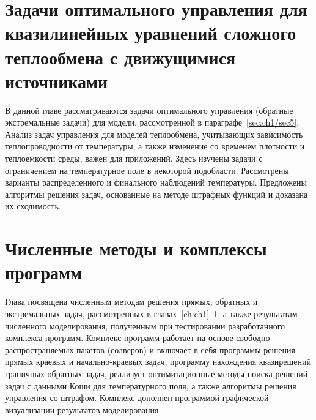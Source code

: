 \documentclass[a4paper,14pt,oneside,openany]{memoir}
\begin{document}
    \chapter{Задачи оптимального управления для квазилинейных уравнений сложного теплообмена с движущимися источниками}
    \label{ch:ch3}
    В данной главе рассматриваются задачи оптимального управления (обратные
    экстремальные задачи) для модели, рассмотренной в параграфе~\ref{sec:ch1/sec5}.
    Анализ задач управления для моделей теплообмена, учитывающих зависимость
    теплопроводности от температуры, а также изменение со временем
    плотности и теплоемкости среды, важен для приложений.
    Здесь изучены задачи с ограничением на температурное поле в некоторой подобласти.
    Рассмотрены варианты распределенного и финального наблюдений температуры.
    Предложены алгоритмы решения задач, основанные на методе
    штрафных функций и доказана их сходимость.
%    
    
    


    \chapter{Численные методы и комплексы программ}\label{ch:ch4}
    Глава посвящена численным методам решения прямых, обратных и экстремальных задач,
    рассмотренных в главах~\ref{ch:ch1}--\ref{ch:ch3}, а также результатам численного моделирования,
    полученным при тестировании разработанного комплекса программ.
    Комплекс программ работает на основе свободно
    распространяемых пакетов (солверов) и включает в себя программы
    решения прямых краевых и начально-краевых задач, программу нахождения
    квазирешений граничных обратных задач, реализует оптимизационные
    методы поиска решений задач с данными Коши для температурного поля, а %
    также алгоритмы решения управления со штрафом.
    Комплекс дополнен программой графической визуализации результатов моделирования.
    
    
    


\setcounter{totalchapter}{\value{chapter}} %

\appendix
\setlength{\midchapskip}{20pt}
\renewcommand*{\afterchapternum}{\par\nobreak\vskip \midchapskip}
\renewcommand\thechapter{\Asbuk{chapter}} %


\setcounter{totalappendix}{\value{chapter}} %
\end{document}
